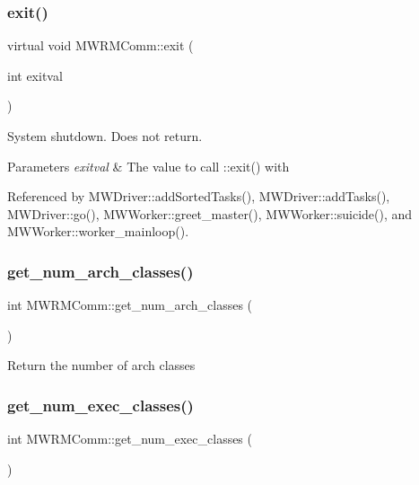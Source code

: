 \subsubsection{\texorpdfstring{exit()}{exit()}}
{\footnotesize\ttfamily virtual void M\+W\+R\+M\+Comm\+::exit (\begin{DoxyParamCaption}\item[{int}]{exitval }\end{DoxyParamCaption})\hspace{0.3cm}{\ttfamily [virtual]}}

System shutdown. Does not return. 
\begin{DoxyParams}{Parameters}
{\em exitval} & The value to call \+::exit() with \\
\hline
\end{DoxyParams}


Referenced by M\+W\+Driver\+::add\+Sorted\+Tasks(), M\+W\+Driver\+::add\+Tasks(), M\+W\+Driver\+::go(), M\+W\+Worker\+::greet\+\_\+master(), M\+W\+Worker\+::suicide(), and M\+W\+Worker\+::worker\+\_\+mainloop().

\mbox{\label{classMWRMComm_a13a4ea4e7279c556ad1608c0b250a33f}} 
\subsubsection{\texorpdfstring{get\+\_\+num\+\_\+arch\+\_\+classes()}{get\_num\_arch\_classes()}}
{\footnotesize\ttfamily int M\+W\+R\+M\+Comm\+::get\+\_\+num\+\_\+arch\+\_\+classes (\begin{DoxyParamCaption}{ }\end{DoxyParamCaption})}

Return the number of arch classes \mbox{\label{classMWRMComm_ac74cbe518e434e9796eba40687a3ec6b}} 
\subsubsection{\texorpdfstring{get\+\_\+num\+\_\+exec\+\_\+classes()}{get\_num\_exec\_classes()}}
{\footnotesize\ttfamily int M\+W\+R\+M\+Comm\+::get\+\_\+num\+\_\+exec\+\_\+classes (\begin{DoxyParamCaption}{ }\end{DoxyParamCaption})}

